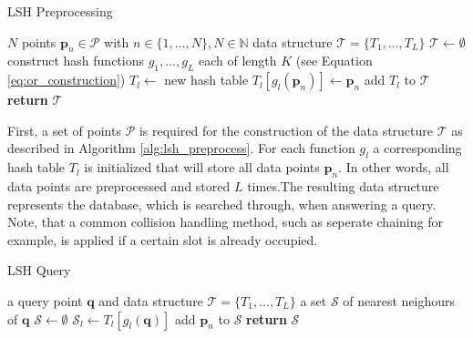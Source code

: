\documentclass[../../../main.tex]{subfiles}
\begin{document}
\begin{algorithm}
    \caption{LSH Preprocessing}
    \label{alg:lsh_preprocess}
    \begin{algorithmic}[1]
        \REQUIRE $N$ points $\bm{p}_n \in \mathcal{P}$ with $n \in \{1, \dots, N\}, N \in \mathbb{N}$
        \ENSURE data structure $\mathcal{T} = \{T_1, \dots, T_L\}$
        \STATE $\mathcal{T} \leftarrow \emptyset$
        \STATE construct hash functions $g_1, \dots, g_L$ each of length $K$ (see Equation \ref{eq:or_construction})
            \STATE $T_l \leftarrow$ new hash table
                \STATE $T_l[g_l(\bm{p}_n)] \leftarrow \bm{p}_n$
            \ENDFOR
            \STATE add $T_l$ to $\mathcal{T}$
        \ENDFOR
        \STATE \textbf{return} $\mathcal{T}$
    \end{algorithmic}
 \end{algorithm}

 First, a set of points $\mathcal{P}$ is required for the construction of the data structure $\mathcal{T}$ as described in Algorithm \ref{alg:lsh_preprocess}. For each function $g_l$ a corresponding hash table $T_l$ is initialized that will store all data points $\bm{p}_n$.  In other words, all data points are preprocessed and stored $L$ times.The resulting data structure represents the database, which is searched through, when answering a query. Note, that a common collision handling method, such as seperate chaining for example, is applied if a certain slot is already occupied.

 \begin{algorithm}
    \caption{LSH Query}
    \label{alg:lsh_query}
    \begin{algorithmic}[1]
        \REQUIRE a query point $\bm{q}$ and data structure $\mathcal{T} = \{T_1, \dots, T_L\}$
        \ENSURE a set $\mathcal{S}$ of nearest neighours of $\bm{q}$
        \STATE $\mathcal{S} \leftarrow \emptyset$
            \STATE $\mathcal{S}_l \leftarrow T_l[g_l(\bm{q})]$
                        \STATE add $\bm{p}_n$ to $\mathcal{S}$
                    \ENDIF
                \ENDFOR
            \ENDIF
        \ENDFOR
        \STATE \textbf{return} $\mathcal{S}$
    \end{algorithmic}
 \end{algorithm}
\end{document}
